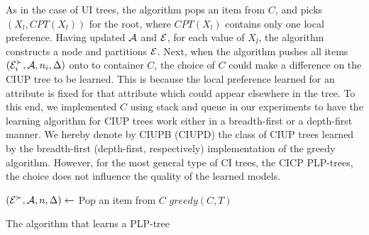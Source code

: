 \smallskip \noindent {}
As in the case of UI trees, the algorithm pops an item from $C$,
and picks $(X_l,CPT(X_l))$
for the root, where $CPT(X_l)$ contains only one local preference.
Having updated $\mathcal{A}$ and $\mathcal{E}$, for each value of $X_l$,
the algorithm constructs a node and partitions $\mathcal{E}$.
Next, when the algorithm pushes all items $(\mathcal{E}^\succ_i,\mathcal{A},n_i,\Delta)$
onto to container $C$, the choice of $C$ could make a difference on
the CIUP tree to be learned.
This is because the local preference learned for an attribute is fixed
for that attribute which could appear elsewhere in the tree.
To this end, we implemented $C$ using stack and queue in our
experiments to have the learning algorithm for CIUP trees work either
in a breadth-first or a depth-first manner.
We hereby denote by CIUPB (CIUPD) the class of CIUP trees
learned by the breadth-first (depth-first, respectively) implementation
of the greedy algorithm.
However, for the most general type of CI trees, the CICP PLP-trees, 
the choice does not influence the quality of the learned models.

\begin{algorithm}[ht]
	$(\mathcal{E}^\succ,\mathcal{A},n,\Delta) \leftarrow$ Pop an item from $C$\;
	$\mathit{greedy}(C,T)$\;

\caption{The  algorithm that learns a PLP-tree \label{alg:recur_learn}}
\end{algorithm}

